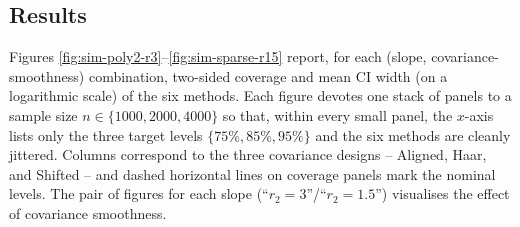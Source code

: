 \documentclass[11pt,a4paper]{article}
\theoremstyle{definition}
\theoremstyle{plain}
\theoremstyle{remark}
\begin{document}
\subsection{Results}\label{subsec:sim-results}

Figures \ref{fig:sim-poly2-r3}--\ref{fig:sim-sparse-r15} report, for each (slope, covariance-smoothness) combination, two-sided coverage and mean CI width (on a logarithmic scale) of the six methods. Each figure devotes one stack of panels to a sample size $n\in\{1000,2000,4000\}$ so that, within every small panel, the $x$-axis lists only the three target levels $\{75\%,85\%,95\%\}$ and the six methods are cleanly jittered. Columns correspond to the three covariance designs -- Aligned, Haar, and Shifted -- and dashed horizontal lines on coverage panels mark the nominal levels. The pair of figures for each slope (``$r_2=3$''/``$r_2=1.5$'') visualises the effect of covariance smoothness.


\end{document}
